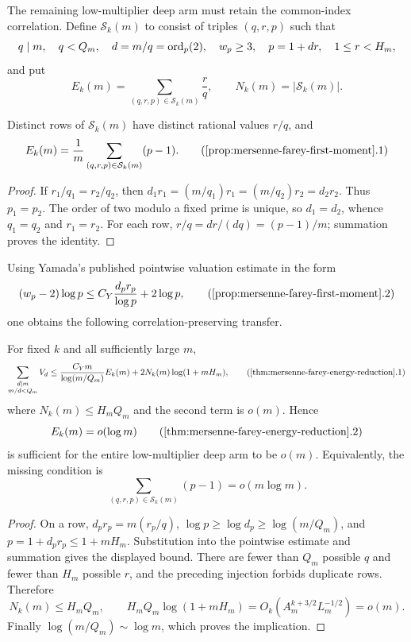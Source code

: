 The remaining low-multiplier deep arm must retain the common-index
correlation.  Define $\mathcal S_k(m)$ to consist of triples $(q,r,p)$ such
that
\[
 q\mid m,\quad q<Q_m,\quad d=m/q=\operatorname{ord}_p(2),\quad
 w_p\ge3,\quad p=1+dr,\quad 1\le r<H_m,
\]
and put
\[
 E_k(m)=\sum_{(q,r,p)\in\mathcal S_k(m)}\frac rq,
 \qquad N_k(m)=|\mathcal S_k(m)|.
\]

\begin{proposition}
\label{prop:mersenne-farey-first-moment}
Distinct rows of $\mathcal S_k(m)$ have distinct rational values
$r/q$, and
\[
 E_k(m)=\frac1m\sum_{(q,r,p)\in\mathcal S_k(m)}(p-1).
 \tag{\ref{prop:mersenne-farey-first-moment}.1}
\]
\end{proposition}

\begin{proof}
If $r_1/q_1=r_2/q_2$, then
$d_1r_1=(m/q_1)r_1=(m/q_2)r_2=d_2r_2$.  Thus $p_1=p_2$.
The order of two modulo a fixed prime is unique, so $d_1=d_2$, whence
$q_1=q_2$ and $r_1=r_2$.  For each row,
$r/q=dr/(dq)=(p-1)/m$; summation proves the identity.
\end{proof}

Using Yamada's published pointwise valuation estimate in the form
\[
 (w_p-2)\log p
 \le C_Y\frac{d_pr_p}{\log p}+2\log p,
 \tag{\ref{prop:mersenne-farey-first-moment}.2}
\]
one obtains the following correlation-preserving transfer.

\begin{theorem}
\label{thm:mersenne-farey-energy-reduction}
For fixed $k$ and all sufficiently large $m$,
\[
 \sum_{\substack{d\mid m\\m/d<Q_m}}V_d
 \le \frac{C_Ym}{\log(m/Q_m)}E_k(m)
       +2N_k(m)\log(1+mH_m),                 \tag{\ref{thm:mersenne-farey-energy-reduction}.1}
\]
where $N_k(m)\le H_mQ_m$ and the second term is $o(m)$.  Hence
\[
                    E_k(m)=o(\log m)          \tag{\ref{thm:mersenne-farey-energy-reduction}.2}
\]
is sufficient for the entire low-multiplier deep arm to be $o(m)$.
Equivalently, the missing condition is
\[
 \sum_{(q,r,p)\in\mathcal S_k(m)}(p-1)=o(m\log m).
\]
\end{theorem}

\begin{proof}
On a row, $d_pr_p=m(r_p/q)$,
$\log p\ge\log d_p\ge\log(m/Q_m)$, and
$p=1+d_pr_p\le1+mH_m$.  Substitution into the pointwise estimate and
summation gives the displayed bound.  There are fewer than $Q_m$ possible
$q$ and fewer than $H_m$ possible $r$, and the preceding injection forbids
duplicate rows.  Therefore
\[
 N_k(m)\le H_mQ_m,\qquad
 H_mQ_m\log(1+mH_m)
 =O_k(A_m^{k+3/2}L_m^{-1/2})=o(m).
\]
Finally $\log(m/Q_m)\sim\log m$, which proves the implication.
\end{proof}

